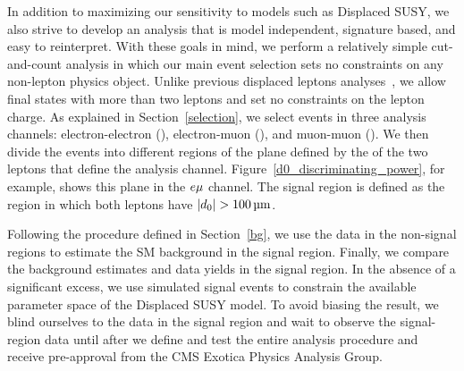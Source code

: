 In addition to maximizing our sensitivity to models such as Displaced SUSY, we also strive to develop an analysis that is model independent, signature based, and easy to reinterpret. With these goals in mind, we perform a relatively simple cut-and-count analysis in which our main event selection sets no constraints on any non-lepton physics object. Unlike previous displaced leptons analyses~\cite{displaced_leptons_run1, displaced_leptons_bing}, we allow final states with more than two leptons and set no constraints on the lepton charge. As explained in Section~\ref{selection}, we select events in three analysis channels: electron-electron (\Pe\Pe), electron-muon (\Pe\Pgm), and muon-muon (\Pgm\Pgm). We then divide the events into different regions of the plane defined by the \ad of the two leptons that define the analysis channel. Figure~\ref{d0_discriminating_power}, for example, shows this plane in the $e{\mu}$ channel. The signal region is defined as the region in which both leptons have $\ad>\SI{100}{\um}$.

Following the procedure defined in Section~\ref{bg}, we use the data in the non-signal regions to estimate the SM background in the signal region. Finally, we compare the background estimates and data yields in the signal region. In the absence of a significant excess, we use simulated signal events to constrain the available parameter space of the Displaced SUSY model. To avoid biasing the result, we blind ourselves to the data in the signal region and wait to observe the signal-region data until after we define and test the entire analysis procedure and receive pre-approval from the CMS Exotica Physics Analysis Group.

\pagebreak